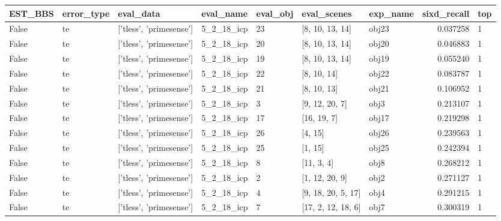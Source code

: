 \documentclass[a4paper,table]{article}
\begin{document}
\begin{adjustbox}{max width=\textwidth}\begin{tabular}{lllllllrl}
\toprule
 EST\_BBS & error\_type &                eval\_data &   eval\_name & eval\_obj &            eval\_scenes & exp\_name &  sixd\_recall & top \\
\midrule
   False &         te &  ['tless', 'primesense'] &  5\_2\_18\_icp &       23 &        [8, 10, 13, 14] &    obj23 &     0.037258 &   1 \\
   False &         te &  ['tless', 'primesense'] &  5\_2\_18\_icp &       20 &        [8, 10, 13, 14] &    obj20 &     0.046883 &   1 \\
   False &         te &  ['tless', 'primesense'] &  5\_2\_18\_icp &       19 &        [8, 10, 13, 14] &    obj19 &     0.055240 &   1 \\
   False &         te &  ['tless', 'primesense'] &  5\_2\_18\_icp &       22 &            [8, 10, 14] &    obj22 &     0.083787 &   1 \\
   False &         te &  ['tless', 'primesense'] &  5\_2\_18\_icp &       21 &            [8, 10, 13] &    obj21 &     0.106952 &   1 \\
   False &         te &  ['tless', 'primesense'] &  5\_2\_18\_icp &        3 &         [9, 12, 20, 7] &     obj3 &     0.213107 &   1 \\
   False &         te &  ['tless', 'primesense'] &  5\_2\_18\_icp &       17 &            [16, 19, 7] &    obj17 &     0.219298 &   1 \\
   False &         te &  ['tless', 'primesense'] &  5\_2\_18\_icp &       26 &                [4, 15] &    obj26 &     0.239563 &   1 \\
   False &         te &  ['tless', 'primesense'] &  5\_2\_18\_icp &       25 &                [1, 15] &    obj25 &     0.242394 &   1 \\
   False &         te &  ['tless', 'primesense'] &  5\_2\_18\_icp &        8 &             [11, 3, 4] &     obj8 &     0.268212 &   1 \\
   False &         te &  ['tless', 'primesense'] &  5\_2\_18\_icp &        2 &         [1, 12, 20, 9] &     obj2 &     0.271127 &   1 \\
   False &         te &  ['tless', 'primesense'] &  5\_2\_18\_icp &        4 &     [9, 18, 20, 5, 17] &     obj4 &     0.291215 &   1 \\
   False &         te &  ['tless', 'primesense'] &  5\_2\_18\_icp &        7 &     [17, 2, 12, 18, 6] &     obj7 &     0.300319 &   1 \\

\end{tabular}
\end{adjustbox}
\end{document}
